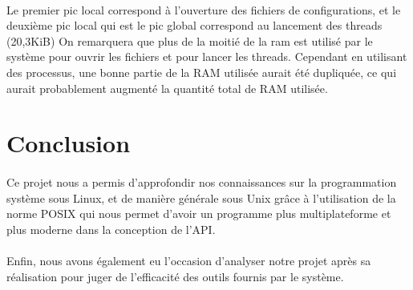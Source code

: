 \documentclass[article, backcover, french, nodocumentinfo]{upmethodology-document}
\begin{document}
					\paragraph*{}
						Le premier pic local correspond à l'ouverture des fichiers de configurations, et le deuxième pic local qui est le pic global correspond au lancement des threads (20,3KiB) On remarquera que plus de la moitié de la ram est utilisé par le système pour ouvrir les fichiers et pour lancer les threads. Cependant en utilisant des processus, une bonne partie de la RAM utilisée aurait été dupliquée, ce qui aurait probablement augmenté la quantité total de RAM utilisée.
	\section*{Conclusion}
		\paragraph*{}
			Ce projet nous a permis d'approfondir nos connaissances sur la programmation système sous Linux, et de manière générale sous Unix grâce à l'utilisation de la norme POSIX qui nous permet d'avoir un programme plus multiplateforme et plus moderne dans la conception de l'API.
		\paragraph*{}
			Enfin, nous avons également eu l'occasion d'analyser notre projet après sa réalisation pour juger de l'efficacité des outils fournis par le système.
\end{document}

